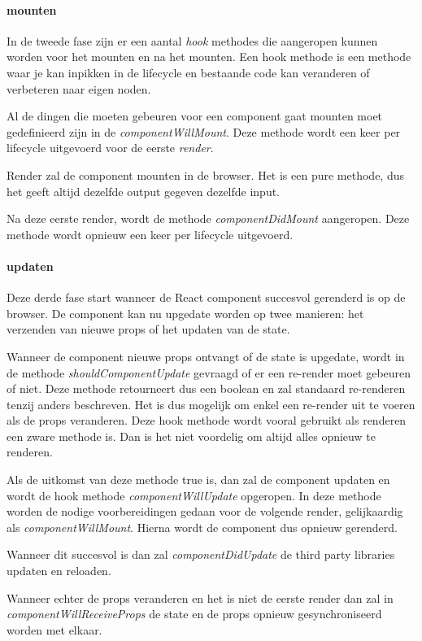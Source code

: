\paragraph{mounten}
In de tweede fase zijn er een aantal \textit{hook} methodes die aangeropen kunnen worden voor het mounten en na het mounten. Een hook methode is een methode waar je kan inpikken in de lifecycle en bestaande code kan veranderen of verbeteren naar eigen noden. 

Al de dingen die moeten gebeuren voor een component gaat mounten moet gedefinieerd zijn in de \textit{componentWillMount}. Deze methode wordt een keer per lifecycle uitgevoerd voor de eerste \textit{render}. 

Render zal de component mounten in de browser. Het is een pure methode, dus het geeft altijd dezelfde output gegeven dezelfde input. 

Na deze eerste render, wordt de methode \textit{componentDidMount} aangeropen. Deze methode wordt opnieuw een keer per lifecycle uitgevoerd. 

\paragraph{updaten}
Deze derde fase start wanneer de React component succesvol gerenderd is op de browser. De component kan nu upgedate worden op twee manieren: het verzenden van nieuwe props of het updaten van de state. 

Wanneer de component nieuwe props ontvangt of de state is upgedate, wordt in de methode \textit{shouldComponentUpdate} gevraagd of er een re-render moet gebeuren of niet. Deze methode retourneert dus een boolean en zal standaard re-renderen tenzij anders beschreven. Het is dus mogelijk om enkel een re-render uit te voeren als de props veranderen. Deze hook methode wordt vooral gebruikt als renderen een zware methode is. Dan is het niet voordelig om altijd alles opnieuw te renderen.

Als de uitkomst van deze methode true is, dan zal de component updaten en wordt de hook methode \textit{componentWillUpdate} opgeropen. In deze methode worden de nodige voorbereidingen gedaan voor de volgende render, gelijkaardig als \textit{componentWillMount}. Hierna wordt de component dus opnieuw gerenderd. 

Wanneer dit succesvol is dan zal \textit{componentDidUpdate} de third party libraries updaten en reloaden. 

Wanneer echter de props veranderen en het is niet de eerste render dan zal in \textit{componentWillReceiveProps} de state en de props opnieuw gesynchroniseerd worden met elkaar. 

